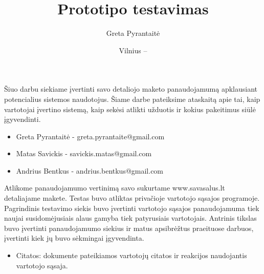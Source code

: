 \documentclass[oneside]{VUMIFPSkursinis}
\title{Prototipo testavimas}
\author{Greta Pyrantaitė}
\date{Vilnius – \the\year}
\begin{document}
\maketitle

Šiuo darbu siekiame įvertinti savo detaliojo maketo panaudojamumą apklausiant potencialius sistemos naudotojus. Šiame darbe pateiksime ataskaitą apie tai, kaip vartotojai įvertino sistemą, kaip sekėsi atlikti užduotis ir kokius pakeitimus siūlė įgyvendinti.

\begin{itemize}
	\item{Greta Pyrantaitė - greta.pyrantaite@gmail.com}
	\item{Matas Savickis - savickis.matas@gmail.com}
	\item{Andrius Bentkus - andrius.bentkus@gmail.com}
\end{itemize}

\tableofcontents


Atlikome panaudojamumo vertinimą savo sukurtame www.savasalus.lt detaliajame makete. Testas buvo atliktas privačioje vartotojo sąsajos programoje.
		Pagrindinis testavimo siekis buvo įvertinti vartotojo sąsajos panaudojamuma tiek naujai susidomėjusiais alaus gamyba tiek patyrusiais vartotojais. Antrinis tikslas buvo įvertinti panaudojamumo siekius ir matus apsibrėžtus praeituose darbuos, įvertinti kiek jų buvo sėkmingai įgyvendinta.
		\begin{itemize}
			\item{Citatos: dokumente pateikiamos vartotojų citatos ir reakcijos naudojantis vartotojo sąsaja.}
		\end{itemize}
\end{document}
